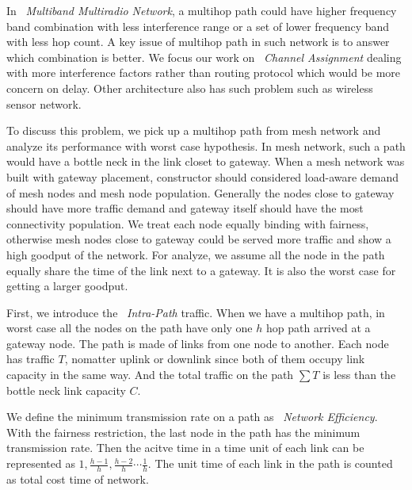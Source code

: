 
In ~\emph{Multiband Multiradio Network}, 
a multihop path could have higher frequency band combination with less interference range or a set of lower frequency band with less hop count.
A key issue of multihop path in such network is to answer which combination is better.
We focus our work on ~\emph{Channel Assignment} dealing with more interference factors rather than routing protocol which would be more concern on delay. Other architecture also has such problem such as wireless sensor network.

To discuss this problem, we pick up a multihop path from mesh network and analyze its performance with worst case hypothesis. In mesh network, such a path would have a bottle neck in the link closet to gateway.
When a mesh network was built with gateway placement, constructor should considered load-aware demand of mesh nodes and mesh node population. 
Generally the nodes close to gateway should have more traffic demand and gateway itself should have the most connectivity population. 
We treat each node equally binding with fairness, otherwise mesh nodes close to gateway could be served more traffic and show a high goodput of the network.
For analyze, we assume all the node in the path equally share the time of the link next to a gateway. It is also the worst case for getting a larger goodput.


First, we introduce the ~\emph{Intra-Path} traffic. When we have a multihop path, in worst case all the nodes on the path have only one $h$ hop path arrived at a gateway node. The path is made of links from one node to another.
Each node has traffic $T$, nomatter uplink or downlink since both of them occupy link capacity in the same way. And the total traffic on the path $\sum T$ is less than the bottle neck link capacity $C$. 

We define the minimum transmission rate on a path as ~\emph{Network Efficiency}. 
With the fairness restriction, the last node in the path has the minimum transmission rate.
Then the acitve time in a time unit of each link can be represented as $1,\frac{h-1}{h},\frac{h-2}{h}\cdots \frac{1}{h}$. 
The unit time of each link in the path is counted as total cost time of network.


